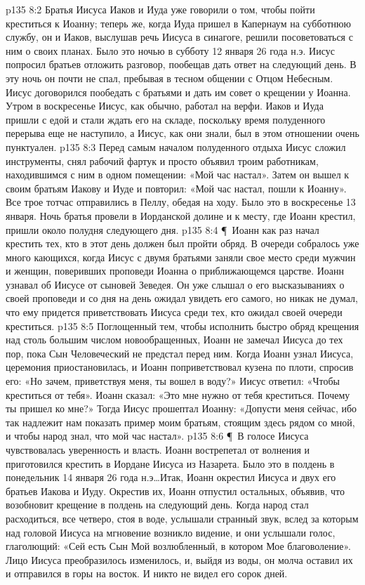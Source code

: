 \vs p135 8:2 Братья Иисуса Иаков и Иуда уже говорили о том, чтобы пойти креститься к Иоанну; теперь же, когда Иуда пришел в Капернаум на субботнюю службу, он и Иаков, выслушав речь Иисуса в синагоге, решили посоветоваться с ним о своих планах. Было это ночью в субботу 12 января 26 года н.э. Иисус попросил братьев отложить разговор, пообещав дать ответ на следующий день. В эту ночь он почти не спал, пребывая в тесном общении с Отцом Небесным. Иисус договорился пообедать с братьями и дать им совет о крещении у Иоанна. Утром в воскресенье Иисус, как обычно, работал на верфи. Иаков и Иуда пришли с едой и стали ждать его на складе, поскольку время полуденного перерыва еще не наступило, а Иисус, как они знали, был в этом отношении очень пунктуален.
\vs p135 8:3 Перед самым началом полуденного отдыха Иисус сложил инструменты, снял рабочий фартук и просто объявил троим работникам, находившимся с ним в одном помещении: «Мой час настал». Затем он вышел к своим братьям Иакову и Иуде и повторил: «Мой час настал, пошли к Иоанну». Все трое тотчас отправились в Пеллу, обедая на ходу. Было это в воскресенье 13 января. Ночь братья провели в Иорданской долине и к месту, где Иоанн крестил, пришли около полудня следующего дня.
\vs p135 8:4 \P\ Иоанн как раз начал крестить тех, кто в этот день должен был пройти обряд. В очереди собралось уже много кающихся, когда Иисус с двумя братьями заняли свое место среди мужчин и женщин, поверивших проповеди Иоанна о приближающемся царстве. Иоанн узнавал об Иисусе от сыновей Зеведея. Он уже слышал о его высказываниях о своей проповеди и со дня на день ожидал увидеть его самого, но никак не думал, что ему придется приветствовать Иисуса среди тех, кто ожидал своей очереди креститься.
\vs p135 8:5 Поглощенный тем, чтобы исполнить быстро обряд крещения над столь большим числом новообращенных, Иоанн не замечал Иисуса до тех пор, пока Сын Человеческий не предстал перед ним. Когда Иоанн узнал Иисуса, церемония приостановилась, и Иоанн поприветствовал кузена по плоти, спросив его: «Но зачем, приветствуя меня, ты вошел в воду?» Иисус ответил: «Чтобы креститься от тебя». Иоанн сказал: «Это мне нужно от тебя креститься. Почему ты пришел ко мне?» Тогда Иисус прошептал Иоанну: «Допусти меня сейчас, ибо так надлежит нам показать пример моим братьям, стоящим здесь рядом со мной, и чтобы народ знал, что мой час настал».
\vs p135 8:6 \P\ В голосе Иисуса чувствовалась уверенность и власть. Иоанн вострепетал от волнения и приготовился крестить в Иордане Иисуса из Назарета. Было это в полдень в понедельник 14 января 26 года н.э\ldots Итак, Иоанн окрестил Иисуса и двух его братьев Иакова и Иуду. Окрестив их, Иоанн отпустил остальных, объявив, что возобновит крещение в полдень на следующий день. Когда народ стал расходиться, все четверо, стоя в воде, услышали странный звук, вслед за которым над головой Иисуса на мгновение возникло видение, и они услышали голос, глаголющий: «Сей есть Сын Мой возлюбленный, в котором Мое благоволение». Лицо Иисуса преобразилось изменилось, и, выйдя из воды, он молча оставил их и отправился в горы на восток. И никто не видел его сорок дней.

